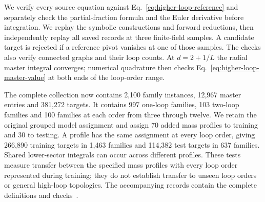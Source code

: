We verify every source equation against
Eq.~\eqref{eq:higher-loop-reference} and separately check the
partial-fraction formula and the Euler derivative before integration. We replay the symbolic constructions
and forward reductions, then independently replay all saved records
at three finite-field samples. A candidate target is rejected if a
reference pivot vanishes at one of those samples. The checks also
verify connected graphs and their loop counts. At $d=2+1/L$ the
radial master integral converges; numerical quadrature then checks
Eq.~\eqref{eq:higher-loop-master-value} at both ends of the loop-order
range.

The complete collection now contains 2,100 family instances,
12,967 master entries and 381,272 targets. It contains 997 one-loop
families, 103 two-loop families and 100 families at each order from
three through twelve. We retain the original grouped model
assignment and assign 70 added mass profiles to training and 30 to
testing. A profile has the same assignment at every loop order,
giving 266,890 training targets in 1,463 families and 114,382
test targets in 637 families. Shared lower-sector integrals can occur
across different profiles. These tests measure transfer between the
specified mass profiles with every loop order represented during
training; they do not establish transfer to unseen loop orders or
general high-loop topologies. The accompanying records contain the
complete definitions and checks~\cite{HigherLoopIntegralData}.

